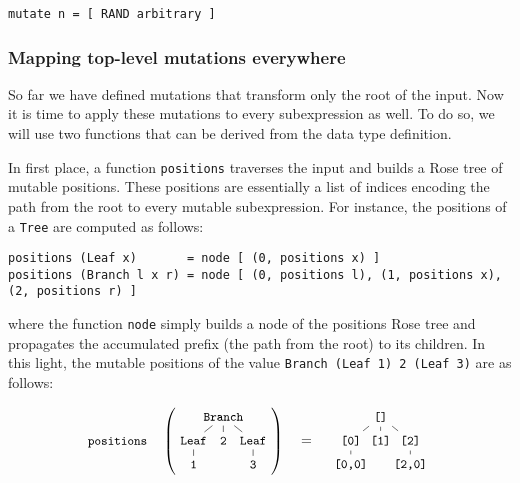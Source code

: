 \documentclass[sigconf, anonymous]{acmart}
\begin{document}
\begin{verbatim}
mutate n = [ RAND arbitrary ]
\end{verbatim}


\subsubsection{Mapping top-level mutations everywhere}

So far we have defined mutations that transform only the root of the input.
%
Now it is time to apply these mutations to every subexpression as well.
%
To do so, we will use two functions that can be derived from the data type
definition.


In first place, a function \texttt{positions} traverses the input and builds a
Rose tree of mutable positions.
%
These positions are essentially a list of indices encoding the path from the
root to every mutable subexpression.
%
For instance, the positions of a \texttt{Tree} are computed as follows:

\begin{verbatim}
positions (Leaf x)       = node [ (0, positions x) ]
positions (Branch l x r) = node [ (0, positions l), (1, positions x), (2, positions r) ]
\end{verbatim}

\noindent where the function \texttt{node} simply builds a node of the positions
Rose tree and propagates the accumulated prefix (the path from the root) to its
children.
%
In this light, the mutable positions of the value \texttt{Branch (Leaf 1) 2
  (Leaf 3)} are as follows:

\begin{equation}
  \nonumber
  {\small \texttt{positions}}\quad
  \left(
  \tikz[
    baseline=-7mm,
    level distance=0.6cm,
    level 1/.style={sibling distance=0.75cm},
    level 2/.style={sibling distance=0.75cm}
  ]{
    \node {\small \texttt{Branch}}
      child {node {\small \texttt{Leaf}}
        child {node {\small \texttt{1}}}
      }
      child {node {\small \texttt{2}}}
      child {node {\small \texttt{Leaf}}
        child {node {\small \texttt{3}}}
      };
  }
  \right)
  \quad
  =
  \quad
  \tikz[
    baseline=-7mm,
    level distance=0.6cm,
    level 1/.style={sibling distance=0.75cm},
    level 2/.style={sibling distance=0.75cm}
  ]{
    \node {\texttt{\small []}}
      child {node {\small \texttt{[0]}}
        child {node {\small \texttt{[0,0]}}}
      }
      child {node {\small \texttt{[1]}}}
      child {node {\small \texttt{[2]}}
        child {node {\small \texttt{[2,0]}}}
      };
  }
\end{equation}
\end{document}
